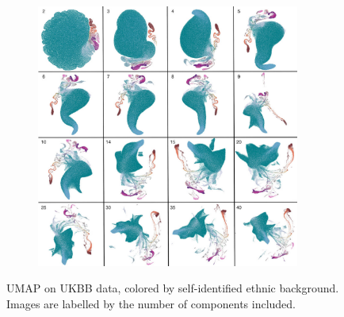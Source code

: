 \documentclass[12pt]{pnas-new}
\begin{document}
\begin{figure}
    \centering
    \begin{subfigure}{0.95\textwidth}
    \includegraphics[width=0.95\textwidth]{images/megamontage_eth_ukbb.pdf}
    \end{subfigure}
    \caption{UMAP on UKBB data, colored by self-identified ethnic background. Images are labelled by the number of components included.}
    \label{fig:supp_montage_ukbb_eth}
\end{figure}
\end{document}
